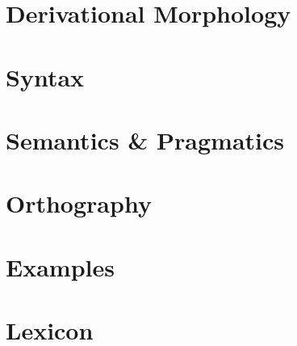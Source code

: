 \documentclass{article}
\begin{document}
\part{Derivational Morphology}
\newpage
\part{Syntax}
\newpage
\part{Semantics \& Pragmatics}
\newpage
\part{Orthography}
\newpage
\part{Examples}
\newpage
\part{Lexicon}
\end{document}
